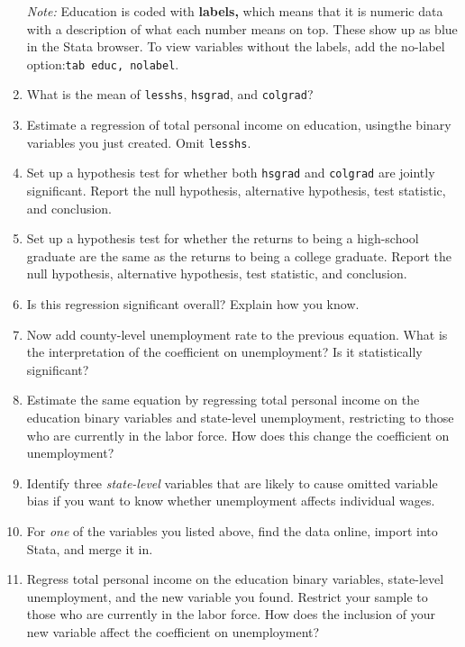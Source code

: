 \documentclass[
]{article}
\begin{document}
\begin{enumerate}
  \emph{Note:} Education is coded with \textbf{labels,} which means that
  it is numeric data with a description of what each number means on
  top. These show up as blue in the Stata browser. To view variables
  without the labels, add the no-label
  option:\texttt{tab\ educ,\ nolabel}.
\item
  What is the mean of \texttt{lesshs}, \texttt{hsgrad}, and
  \texttt{colgrad}?
\item
  Estimate a regression of total personal income on education, usingthe
  binary variables you just created. Omit \texttt{lesshs}.
\item
  Set up a hypothesis test for whether both \texttt{hsgrad} and
  \texttt{colgrad} are jointly significant. Report the null hypothesis,
  alternative hypothesis, test statistic, and conclusion.
\item
  Set up a hypothesis test for whether the returns to being a
  high-school graduate are the same as the returns to being a college
  graduate. Report the null hypothesis, alternative hypothesis, test
  statistic, and conclusion.
\item
  Is this regression significant overall? Explain how you know.
\item
  Now add county-level unemployment rate to the previous equation. What
  is the interpretation of the coefficient on unemployment? Is it
  statistically significant?
\item
  Estimate the same equation by regressing total personal income on the
  education binary variables and state-level unemployment, restricting
  to those who are currently in the labor force. How does this change
  the coefficient on unemployment?
\item
  Identify three \emph{state-level} variables that are likely to cause
  omitted variable bias if you want to know whether unemployment affects
  individual wages.
\item
  For \emph{one} of the variables you listed above, find the data
  online, import into Stata, and merge it in.
\item
  Regress total personal income on the education binary variables,
  state-level unemployment, and the new variable you found. Restrict
  your sample to those who are currently in the labor force. How does
  the inclusion of your new variable affect the coefficient on
  unemployment?
\end{enumerate}
\end{document}
